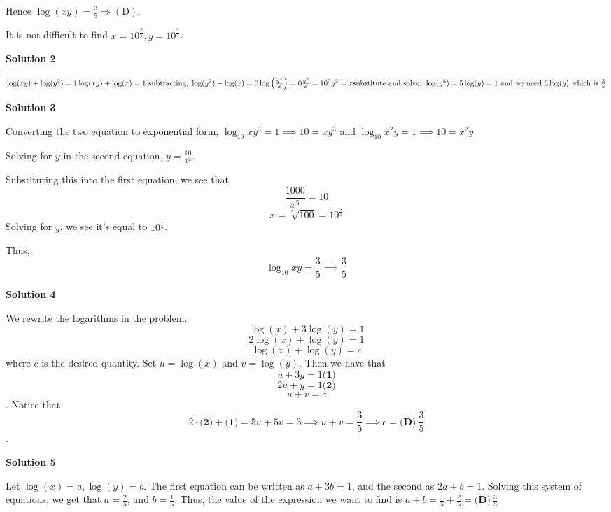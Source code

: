 \begin{enumerate}
 Hence $\log (xy) = \frac 35 \Rightarrow \mathrm{(D)}$.

 It is not difficult to find $x = 10^{\frac{2}{5}}, y = 10^{\frac{1}{5}}$.

 



\textbf{Solution 2}

$\log(xy)+\log(y^2)=1 \\ \log(xy)+\log(x)=1 \text{ subtracting, } \\ \log(y^2)-\log(x)=0 \\ \log \left(\frac{y^2}{x}\right)=0 \\ \frac{y^2}{x}=10^0 \\ y^2=x \\ \text{substitute and solve: } \log(y^5)=5\log(y)=1 \\ \text{ and we need } 3\log(y) \text{ which is } \frac{3}{5}$




\textbf{Solution 3}

Converting the two equation to exponential form, $\log_{10} xy^3 = 1 \implies 10 = xy^3$ and $\log_{10} x^2y = 1 \implies 10 = x^2y$

 Solving for $y$ in the second equation, $y = \frac{10}{x^2}$.

 Substituting this into the first equation, we see that
 \[\frac{1000}{x^5} = 10\]
 \[x =  \sqrt[5]{100} = 10^{\frac{2}{5}}\]Solving for $y$, we see it's equal to  $10^{\frac{1}{5}}$.

 Thus, 
 \[\log_{10} xy = \frac{3}{5} \implies \boxed{\frac{3}{5}}\]




\textbf{Solution 4}

We rewrite the logarithms in the problem. 
 \[\log(x) + 3\log(y) = 1\] 
 \[2\log(x) + \log(y) = 1\] 
 \[\log(x) + \log(y) = c\] where $c$ is the desired quantity. Set $u = \log(x)$ and $v = \log(y)$. Then we have that 
 \[u + 3y = 1 \textbf{(1)}\] 
 \[2u + y = 1 \textbf{(2)}\] 
 \[u + v = c\]. Notice that 
 \[2 \cdot \textbf{(2)} + \textbf{(1)} = 5u + 5v = 3 \implies u + v = \frac{3}{5} \implies c = \boxed{\textbf{(D)}~\frac{3}{5}}\].

 



\textbf{Solution 5}

Let $\log(x) = a, \log(y) = b$. The first equation can be written as $a + 3b = 1$, and the second as $2a + b = 1$. Solving this system of equations, we get that $a = \frac{2}{5}$, and $b = \frac{1}{5}$. Thus, the value of the expression we want to find is $a + b = \frac{1}{5} + \frac{2}{5} = \boxed{\textbf{(D)}~\frac{3}{5}}$




\end{enumerate}
